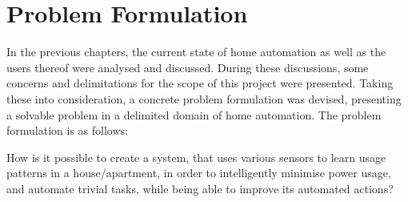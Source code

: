 \section{Problem Formulation}
In the previous chapters, the current state of home automation as well as the users thereof were analysed and discussed. During these discussions, some concerns and delimitations for the scope of this project were presented. Taking these into consideration, a concrete problem formulation was devised, presenting a solvable problem in a delimited domain of home automation. The problem formulation is as follows:

How is it possible to create a system, that uses various sensors to learn usage patterns in a house/apartment, in order to intelligently minimise power usage, and automate trivial tasks, while being able to improve its automated actions?
